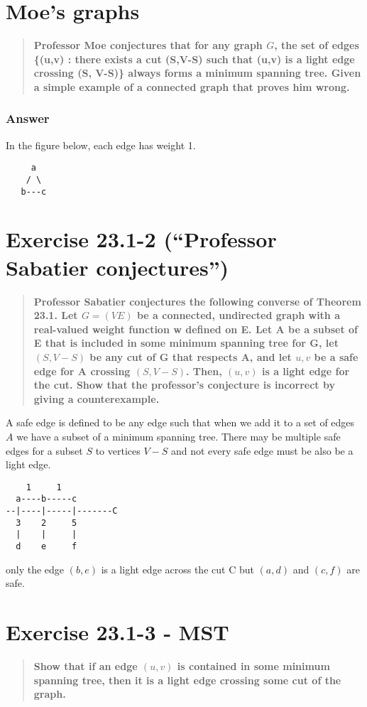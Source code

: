 \documentclass[titlepage]{article}\usepackage[]{graphicx}\usepackage[]{color}
\begin{document}
\section{Moe's graphs}
\begin{quote}
  \textbf{Professor Moe conjectures that for any graph $G$, the set of
edges \{(u,v) : there exists a cut (S,V-S) such that (u,v) is a light
edge crossing (S, V-S)\} always forms a minimum spanning tree.  Given
a simple example of a connected graph that proves him wrong.}
\end{quote}
\subsubsection{Answer}
In the figure below, each edge has weight 1.
\begin{verbatim}
     a
    / \
   b---c
   \end{verbatim}

\section{ Exercise 23.1-2 (``Professor Sabatier conjectures'')}
\begin{quote}
  \textbf{Professor Sabatier conjectures the following converse of Theorem
  23.1. Let $G = (V E)$  be a connected, undirected graph with a real-valued weight function w
defined on E. Let A be a subset of E that is included in some minimum spanning
tree for G, let $(S, V- S)$ be any cut of G that respects A, and let $u,v$ be a
safe edge for A crossing $(S, V-S)$. Then, $(u,v)$ is a light edge for the cut. Show
that the professor’s conjecture is incorrect by giving a counterexample.}
\end{quote}

A safe edge is defined to be any edge such that when we add it to a set of
edges $A$ we have a subset of a minimum spanning tree. There may be multiple
safe edges for a subset $S$ to vertices $V-S$ and not every safe edge must be
also be a light edge. 

\begin{verbatim}
    1     1
  a----b-----c
--|----|-----|-------C
  3    2     5
  |    |     |
  d	   e     f
\end{verbatim}

  only the edge $(b,e)$ is a light edge across the cut C but $(a,d)$ and
  $(c,f)$ are safe. 


\section{ Exercise 23.1-3 - MST} 
\begin{quote}
  \textbf{Show that if an edge $(u,v)$ is contained in some minimum spanning
  tree, then it is a light edge crossing some cut of the graph.}
\end{quote}
\end{document}
